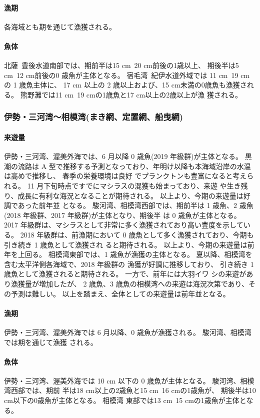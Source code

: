 \documentclass[11pt]{article}
\begin{document}
\paragraph{漁期}
各海域とも期を通じて漁獲される。
\paragraph{魚体}
北薩~豊後水道南部では、期前半は15 cm~20 cm前後の1歳以上、
期後半は5 cm~12 cm前後の0 歳魚が主体となる。
宿毛湾~紀伊水道外域では 11 cm~19 cm の 1 歳魚主体に、
17 cm 以上の 2 歳以上および、15 cm未満の0歳魚も漁獲される。
熊野灘では11 cm~19 cmの1歳魚と17 cm以上の2歳以上が漁 獲される。


\subsubsection{伊勢・三河湾〜相模湾(まき網、定置網、船曳網)}
\paragraph{来遊量}
伊勢・三河湾、渥美外海では、6 月以降 0 歳魚(2019 年級群)が主体となる。
黒潮の流路は A 型で推移する予測となっており、年明け以降も本海域沿岸の水温は高めで推移し、
春季の栄養環境は良好 でプランクトンも豊富になると考えられる。
11 月下旬時点ですでにマシラスの混獲も始まっており、来遊 や生き残り、成長に有利な海況となることが期待される。
以上より、今期の来遊量は好調であった前年並 となる。
駿河湾、相模湾西部では、期前半は 1 歳魚、2 歳魚(2018 年級群、2017 年級群)が主体となり、期後半 は 0 歳魚が主体となる。
2017 年級群は、マシラスとして非常に多く漁獲されており高い豊度を示している。
2018 年級群は、前漁期において 0 歳魚として多く漁獲されており、今期も引き続き 1 歳魚として漁獲され ると期待される。
以上より、今期の来遊量は前年を上回る。
相模湾東部では、1 歳魚が漁獲の主体となる。
夏以降、相模湾を含む太平洋側各海域で、2018 年級群の 漁獲が好調に推移しており、
引き続き 1 歳魚として漁獲されると期待される。
一方で、前年には大羽イワ シの来遊があり漁獲量が増加したが、
2 歳魚、3 歳魚の相模湾への来遊は海況次第であり、その予測は難しい。
以上を踏まえ、全体としての来遊量は前年並となる。
\paragraph{漁期}
伊勢・三河湾、渥美外海では 6 月以降、0 歳魚が漁獲される。
駿河湾、相模湾では期を通じて漁獲 される。
\paragraph{魚体}
伊勢・三河湾、渥美外海では 10 cm 以下の 0 歳魚が主体となる。
駿河湾、相模湾西部では、期前 半は18 cm以上の2歳魚と15 cm~16 cmの1歳魚が、
期後半は10 cm以下の0歳魚が主体となる。
相模湾 東部では13 cm~15 cmの1歳魚が主体となる。
\end{document}
